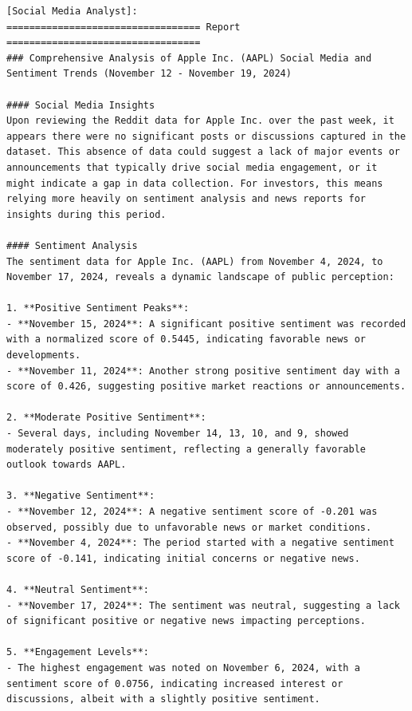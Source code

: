 \begin{tcolorbox}[
    breakable,
    enhanced,
    colback=lightbeige!70!white,
    colframe=brown!20!gray,
    coltitle=black,
    boxrule=0.5pt,
    arc=0.5mm,
    top=2mm, bottom=2mm, left=2mm, right=2mm,
    fonttitle=\usefont{T1}{ppl}{b}{n},
    title=\model: Social Media Analysts Team -- Apple (AAPL),
]
\footnotesize
\begin{lstlisting}[style=agentbase]
[Social Media Analyst]:
================================== Report ==================================
### Comprehensive Analysis of Apple Inc. (AAPL) Social Media and Sentiment Trends (November 12 - November 19, 2024)

#### Social Media Insights
Upon reviewing the Reddit data for Apple Inc. over the past week, it appears there were no significant posts or discussions captured in the dataset. This absence of data could suggest a lack of major events or announcements that typically drive social media engagement, or it might indicate a gap in data collection. For investors, this means relying more heavily on sentiment analysis and news reports for insights during this period.

#### Sentiment Analysis
The sentiment data for Apple Inc. (AAPL) from November 4, 2024, to November 17, 2024, reveals a dynamic landscape of public perception:

1. **Positive Sentiment Peaks**:
- **November 15, 2024**: A significant positive sentiment was recorded with a normalized score of 0.5445, indicating favorable news or developments.
- **November 11, 2024**: Another strong positive sentiment day with a score of 0.426, suggesting positive market reactions or announcements.

2. **Moderate Positive Sentiment**:
- Several days, including November 14, 13, 10, and 9, showed moderately positive sentiment, reflecting a generally favorable outlook towards AAPL.

3. **Negative Sentiment**:
- **November 12, 2024**: A negative sentiment score of -0.201 was observed, possibly due to unfavorable news or market conditions.
- **November 4, 2024**: The period started with a negative sentiment score of -0.141, indicating initial concerns or negative news.

4. **Neutral Sentiment**:
- **November 17, 2024**: The sentiment was neutral, suggesting a lack of significant positive or negative news impacting perceptions.

5. **Engagement Levels**:
- The highest engagement was noted on November 6, 2024, with a sentiment score of 0.0756, indicating increased interest or discussions, albeit with a slightly positive sentiment.


\end{lstlisting}
\end{tcolorbox}
